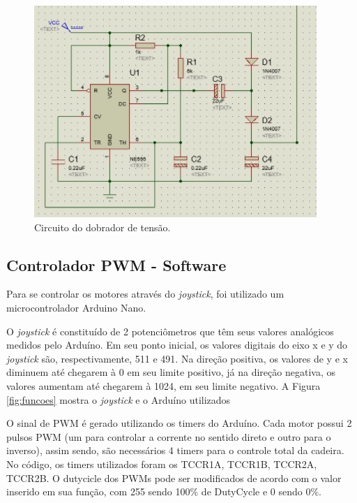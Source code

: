 \begin{figure}[h!]
  \centering
  \includegraphics[scale=0.9]{figuras/Dobrador.jpg}
  \caption{Circuito do dobrador de tensão.}
    \label{fig:dobrador}
\end{figure}

\subsection{Controlador PWM - Software}

Para se controlar os motores através do \textit{joystick}, foi utilizado um
microcontrolador Arduino Nano.

O \textit{joystick} é constituído de 2 potenciômetros que têm seus valores
analógicos medidos pelo Arduíno. Em seu ponto inicial, os valores digitais do eixo x e y
do \textit{joystick} são, respectivamente, 511 e 491. Na direção positiva, os valores de
y e x diminuem até chegarem à 0 em seu limite positivo, já na direção negativa,
os valores aumentam até chegarem à 1024, em seu limite negativo. A Figura
\ref{fig:funcoes} mostra o \textit{joystick} e o Arduíno utilizados

O sinal de PWM é gerado utilizando os timers do Arduíno. Cada motor possui 2 pulsos PWM (um para controlar a corrente no sentido direto e outro para o inverso), assim sendo, são necessários 4 timers para o controle total da cadeira. No código, os timers utilizados foram os TCCR1A, TCCR1B, TCCR2A, TCCR2B. O dutycicle dos PWMs pode ser modificados de acordo com o valor inserido em sua função, com 255 sendo 100\% de DutyCycle e 0 sendo 0\%.

